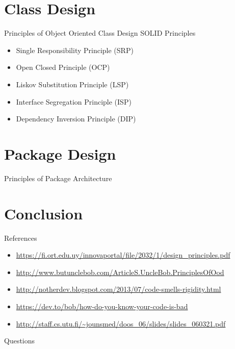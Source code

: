 \documentclass[xcolor=svgnames]{beamer}
\begin{document}
\section
    {Class Design}

\begin{frame}{Principles of Object Oriented Class Design}
    SOLID Principles
    \begin{itemize}
        \item Single Responsibility Principle (SRP)
        \item Open Closed Principle (OCP)
        \item Liskov Substitution Principle (LSP)
        \item Interface Segregation Principle (ISP)
        \item Dependency Inversion Principle (DIP)
    \end{itemize}
\end{frame}


\section
    {Package Design}

\begin{frame}
    {Principles of Package Architecture}



\end{frame}




\section
  {Conclusion}

\begin{frame}
  {References}

  \begin{itemize}
  \item \url{https://fi.ort.edu.uy/innovaportal/file/2032/1/design_principles.pdf}
  \item \url{http://www.butunclebob.com/ArticleS.UncleBob.PrinciplesOfOod}
  \item \url{http://notherdev.blogspot.com/2013/07/code-smells-rigidity.html}
  \item \url{https://dev.to/bob/how-do-you-know-your-code-is-bad}
  \item \url{http://staff.cs.utu.fi/~jounsmed/doos_06/slides/slides_060321.pdf}
  \end{itemize}
\end{frame}


\begin{frame}
  {Questions}

\end{frame}
\end{document}
